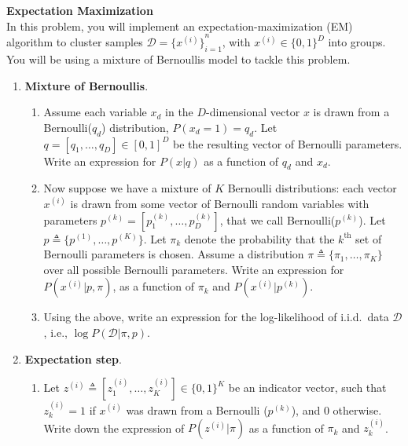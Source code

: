 \begin{Q}
\textbf{\Large  Expectation Maximization}\\
In this problem, you will implement an expectation-maximization (EM) algorithm to cluster samples $\mathcal{D}={\{x^{(i)}\}}_{i=1}^{n}$, with $x^{(i)} \in {\{ 0,1 \}}^{D}$ into groups. You will be using a mixture of Bernoullis model to tackle this problem. 


\begin{enumerate}

\item \textbf{Mixture of Bernoullis}. 

\begin{enumerate}
\item Assume each variable $x_d$ in the $D$-dimensional vector $x$ is drawn from a Bernoulli($q_{d}$) distribution, $P(x_{d}=1)=q_{d}$. Let $q=[q_{1}, \ldots, q_{D}] \in [0,1]^{D}$ be the resulting vector of Bernoulli parameters. Write an expression for $P(x|q)$ as a function of $q_d$ and $x_{d}$.

\item Now suppose we have a mixture of $K$ Bernoulli distributions: each vector $x^{(i)}$ is drawn from some vector of Bernoulli random variables with parameters $p^{(k)}=[p_{1}^{(k)}, \ldots, p_{D}^{(k)}]$, that we call Bernoulli($p^{(k)}$). Let $p \triangleq \{p^{(1)}, \ldots , p^{(K)}\}$. 
Let $\pi_{k}$ denote the probability that the $k^{\text{th}}$ set of Bernoulli parameters is chosen.
Assume a distribution $\pi \triangleq \{ \pi_1, \dots, \pi_K \}$ over all possible Bernoulli parameters.
Write an expression for $P(x^{(i)}|p, \pi)$, as a function of $\pi_{k}$ and $P(x^{(i)}|p^{(k)})$.

\item Using the above, write an expression for the log-likelihood of i.i.d.\ data $\mathcal{D}$, i.e., $\log P(\mathcal{D}|\pi, p)$.

\end{enumerate}

\item  \textbf{Expectation step}. 

\begin{enumerate}
\item Let $z^{(i)} \triangleq [ z_1^{(i)}, \dots, z_K^{(i)}  ] \in {\{ 0,1\}}^{K}$ be an indicator vector, such that $z_{k}^{(i)}=1$ if $x^{(i)}$ was drawn from a Bernoulli ($p^{(k)}$), and 0 otherwise.  
Write down the expression of $P(z^{(i)}|\pi)$ as a function of $\pi_{k}$ and ${z_{k}^{(i)}}$. 


\end{enumerate}
\end{enumerate}
\end{Q}
